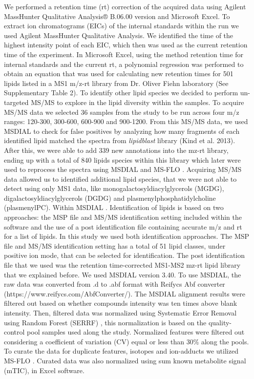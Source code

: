 \documentclass[9pt,twocolumn,twoside,lineno]{gsajnl}
\begin{document}
We performed a retention time (rt) correction of the acquired data using Agilent MassHunter Qualitative Analysis® B.06.00 version and Microsoft Excel. 
To extract ion chromatograms (EICs) of the internal standards within the run we used Agilent MassHunter Qualitative Analysis.
We identified the time of the highest intensity point of each EIC, which then was used as the current retention time of the experiment. 
In Microsoft Excel, using the method retention time for internal standards and the current rt, a polynomial regression was performed to obtain an equation that was used for calculating new retention times for 501 lipids listed in a MS1 m/z-rt library from Dr. Oliver Fiehn laboratory (See Supplementary Table 2). 
To identify other lipid species we decided to perform un-targeted MS/MS to explore in the lipid diversity within the samples. 
To acquire MS/MS data we selected 36 samples from the study to be run across four m/z ranges: 120-300, 300-600, 600-900 and 900-1200. 
From this MS/MS data, we used MSDIAL \cite{Tsugawa2015-kh} to check for false positives by analyzing how many fragments of each identified lipid matched the spectra from \textit{lipidblast} library (Kind et al. 2013). 
After this, we were able to add 339 new annotations into the mz-rt library, ending up with a total of 840 lipids species within this library which later were used to reprocess the spectra using MSDIAL and MS-FLO \cite{DeFelice}. 
Acquiring MS/MS data allowed us to identified additional lipid species, that we were not able to detect using only MS1 data, like monogalactosyldiacylglycerols (MGDG), digalactosyldiacylglycerols (DGDG) and plasmenylphosphatidylcholine (plasmenylPC). 
Within MSDIAL \cite{Tsugawa2015-kh}. Identification of lipids is based on two approaches: the MSP file and MS/MS identification setting included within the software and the use of a post identification file containing accurate m/z and rt for a list of lipids. In this study we used both identification approaches. 
The MSP file and MS/MS identification setting has a total of 51 lipid classes, under positive ion mode, that can be selected for identification. 
The post identification file that we used was the retention time-corrected MS1-MS2 mz-rt lipid library that we explained before. 
We used MSDIAL \cite{Tsugawa2015-kh} version 3.40. To use MSDIAL, the raw data was converted from .d to .abf format with Reifycs Abf converter (https://www.reifycs.com/AbfConverter/). The MSDIAL alignment results were filtered out based on whether compounds intensity was ten times above blank intensity. Then, filtered data was normalized using Systematic Error Removal using Random Forest (SERRF) \cite{Fan2019}, this normalization is based on the quality-control pool samples used along the study. Normalized features were filtered out considering a coefficient of variation (CV) equal or less than 30\% along the pools. To curate the data for duplicate features, isotopes and ion-adducts we utilized MS-FLO \cite{DeFelice}. Curated data was also normalized using sum known metabolite signal (mTIC), in Excel software.
\end{document}
